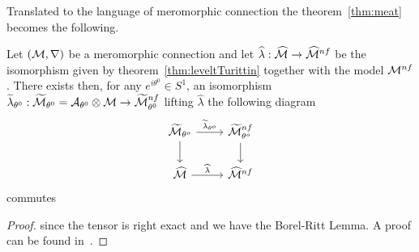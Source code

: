 Translated to the language of meromorphic connection the theorem~\ref{thm:meat}
becomes the following.
\begin{thm}
  Let $(\mathcal{M},\nabla)$ be a meromorphic connection and let
  $\widehat\lambda:\widehat{\mathcal{M}}\to\widehat{\mathcal{M}}^{nf}$ be the isomorphism given by
  theorem~\ref{thm:leveltTurittin} together with the model $\mathcal{M}^{nf}$.
  There exists then, for any $e^{i\theta^0}\in S^1$, an isomorphism
  $\widetilde\lambda_{\theta^0}:
  \widetilde{\mathcal{M}}_{\theta^0}=\mathcal{A}_{\theta^0}\otimes\mathcal{M}\to\widetilde{\mathcal{M}}_{\theta^0}^{nf}$
  lifting $\hat\lambda$  the following diagram
  \[ \begin{tikzcd}
      \tilde\cM_{\theta^o} \dar \rar{\tilde\lambda_{\theta^o}} &
      \tilde\cM^{nf}_{\theta^o} \dar
      \\\hat\cM \rar{\hat\lambda} &
      \hat\cM^{nf}
  \end{tikzcd} \]
  commutes
\end{thm}
\begin{proof}
   since the tensor is right exact and we have the
  Borel-Ritt Lemma.
  A proof can be found in~\cite[Sec.II.2.4]{sabbah_cimpa90}.
\end{proof}

\begin{comment}
  \begin{multicols}{2}
    \begin{thm}
      \marginnote{\cite[Thm.II.2.3.1]{sabbah_cimpa90}}
      \rewrite{Let $\cM_{K}$ be a meromorphic connection. There exists an
        integer $q\geq 1$ such that, after the ramification $x=t^q$, one has,
        for all $\theta\in S^1$ and each sufficiently small interval $V$
        centered at $\theta$}
      \[
        \cA_L(V)\otimes_L\cM_L\cong\cA_L(V)\otimes_L
        \left(\cF_L^R\otimes\cG_L\right)
      \]
    \end{thm}
    \begin{proof}
      See \cite[Sec.II.2.4]{sabbah_cimpa90}
    \end{proof}
  \columnbreak
  \end{multicols}
\end{comment}

